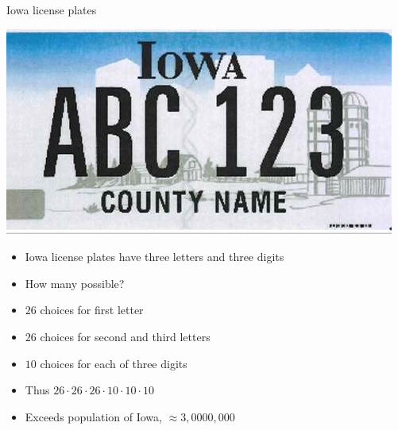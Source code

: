 \documentclass[handout]{beamer}
\theoremstyle{definition}
\begin{document}
\begin{frame}{Iowa license plates}
\begin{multicols}{2}
\includegraphics[scale=.3]{LicencePlate}
\begin{itemize}
\item Iowa license plates have three letters
and three digits
\item How many possible?
\item $26$ choices for first letter
\columnbreak
\item $26$ choices for second and third letters
\item $10$ choices for each of three digits
\item Thus $26\cdot 26\cdot 26\cdot 10\cdot 10\cdot 10$
\item Exceeds population of Iowa, $\approx 3,0000,000$
\end{itemize}
\end{multicols}
\end{frame}
\end{document}
